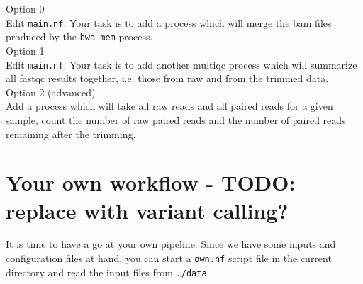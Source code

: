 \begin{steps}

Option 0\\
Edit \texttt{main.nf}. Your task is to add a process which will merge the bam files produced by the \texttt{bwa\_mem} process.\\ 

Option 1\\
Edit \texttt{main.nf}. Your task is to add another multiqc process which will summarize all fastqc results together, i.e. those from raw and from the trimmed data. \\

Option 2 (advanced) \\
Add a process which will take all raw reads and all paired reads for a given sample, count the number of raw paired reads and the number of paired reads remaining after the trimming.


\end{steps}

\section{Your own workflow - TODO: replace with variant calling?}

It is time to have a go at your own pipeline. 
Since we have some inputs and configuration files at hand, 
you can start a \texttt{own.nf} script file in the current 
directory and read the input files from \texttt{./data}. 



